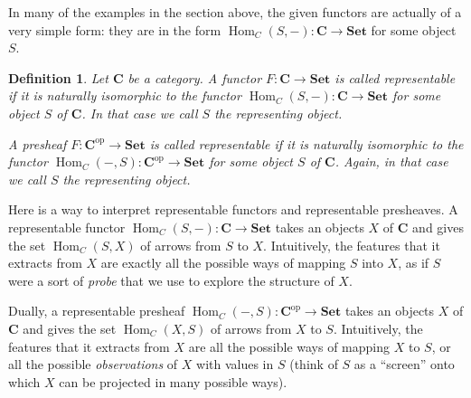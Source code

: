\documentclass[a4paper,11pt,oneside]{scrbook}
\numberwithin{equation}{section}
\theoremstyle{plain}
\newtheorem{deph}[thm]{Definition}
\theoremstyle{definition}
\DeclareMathOperator{\Hom}{Hom}
\newcommand{\cat}[1]{{\mathbf{#1}}} %
\newcommand{\op}{\mathrm{op}} %
\newcommand{\Set}{\cat{Set}}
\DeclareMathOperator{\1}{\mathbbm{1}}
\DeclareMathOperator{\2}{\mathbbm{2}}
\begin{document}
In many of the examples in the section above, the given functors are actually of a very simple form: they are in the form $\Hom_{C}(S,-):\cat{C}\to\Set$ for some object $S$. 

\begin{deph}
 Let $\cat{C}$ be a category. A functor $F:\cat{C}\to\Set$ is called \emph{representable} if it is naturally isomorphic to the functor $\Hom_{C}(S,-):\cat{C}\to\Set$ for some object $S$ of $\cat{C}$. In that case we call $S$ the \emph{representing object}. 
 
 A presheaf $F:\cat{C}^\op\to\Set$ is called \emph{representable} if it is naturally isomorphic to the functor $\Hom_{C}(-,S):\cat{C}^\op\to\Set$ for some object $S$ of $\cat{C}$. Again, in that case we call $S$ the \emph{representing object}. 
\end{deph}

Here is a way to interpret representable functors and representable presheaves. 
A representable functor $\Hom_{C}(S,-):\cat{C}\to\Set$ takes an objects $X$ of $\cat{C}$ and gives the set $\Hom_{C}(S,X)$ of arrows from $S$ to $X$. Intuitively, the features that it extracts from $X$ are exactly all the possible ways of mapping $S$ into $X$, as if $S$ were a sort of \emph{probe} that we use to explore the structure of $X$.

Dually, a representable presheaf $\Hom_{C}(-,S):\cat{C}^\op\to\Set$ takes an objects $X$ of $\cat{C}$ and gives the set $\Hom_{C}(X,S)$ of arrows from $X$ to $S$. Intuitively, the features that it extracts from $X$ are all the possible ways of mapping $X$ to $S$, or all the possible \emph{observations} of $X$ with values in $S$ (think of $S$ as a ``screen'' onto which $X$ can be projected in many possible ways). 
\end{document}
